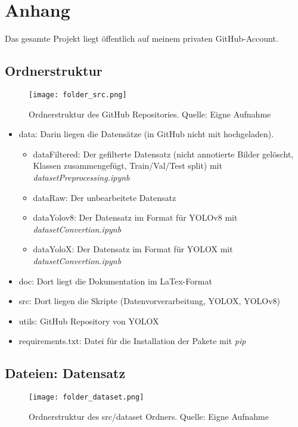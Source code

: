 \chapter{Anhang}\label{chap:appendix}
Das gesamte Projekt liegt öffentlich auf meinem privaten GitHub-Account. \cite{deepvisionProjectGitHub}

\section{Ordnerstruktur}
\begin{figure}[h]
	\centering
	\texttt{[image: folder\_src.png]}
	\caption[Ordnerstruktur des GitHub Repositories]{Ordnerstruktur des GitHub Repositories. Quelle: Eigne Aufnahme}
\end{figure}

\begin{itemize}
	\item data: Darin liegen die Datensätze (in GitHub nicht mit hochgeladen).
	\begin{itemize}
		\item dataFiltered: Der gefilterte Datensatz (nicht annotierte Bilder gelöscht, Klassen zusammengefügt, Train/Val/Test split) mit \textit{datasetPreprocessing.ipynb}
		\item dataRaw: Der unbearbeitete Datensatz \cite{datasetSelfDrivingCar}
		\item dataYolov8: Der Datensatz im Format für YOLOv8 mit \textit{datasetConvertion.ipynb}
		\item dataYoloX:  Der Datensatz im Format für YOLOX mit \textit{datasetConvertion.ipynb}
	\end{itemize}
	\item doc: Dort liegt die Dokumentation im LaTex-Format
	\item src: Dort liegen die Skripte (Datenvorverarbeitung, YOLOX, YOLOv8)
	\item utils: GitHub Repository von YOLOX
	\item requirements.txt: Datei für die Installation der Pakete mit \textit{pip}
\end{itemize}

\section{Dateien: Datensatz}
\begin{figure}[h]
	\centering
	\texttt{[image: folder\_dataset.png]}
	\caption[Ordnerstruktur des src/dataset Ordners.]{Ordnerstruktur des src/dataset Ordners. Quelle: Eigne Aufnahme}
\end{figure}

